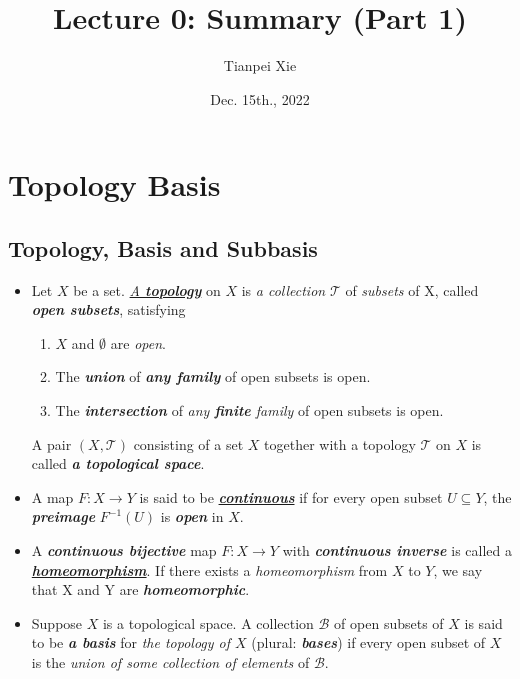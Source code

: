 \documentclass[11pt]{article}
\begin{document}
\title{Lecture 0: Summary (Part 1)}
\author{ Tianpei Xie}
\date{ Dec. 15th., 2022 }
\maketitle
\tableofcontents
\newpage
\section{Topology Basis}
\subsection{Topology, Basis and Subbasis}
\begin{itemize}
\item 
\begin{definition} 
Let $X$ be a set. \underline{\emph{A \textbf{topology}}} on $X$ is \emph{a collection} $\mathscr{T}$ of \emph{subsets} of X, called \emph{\textbf{open subsets}}, satisfying
\begin{enumerate}
\item $X$ and $\emptyset$ are \emph{open}.
\item The \emph{\textbf{union}} of \emph{\textbf{any family}} of open subsets is open.
\item The \emph{\textbf{intersection}} of \emph{any \textbf{finite} family} of open subsets is open.
\end{enumerate}
A pair $(X, \mathscr{T})$ consisting of a set $X$ together with a topology $\mathscr{T}$ on $X$ is called \emph{\textbf{a topological space}}.
\end{definition}

\item \begin{definition}
A map $F: X \rightarrow Y$ is said to be \underline{\emph{\textbf{continuous}}} if for every open subset $U \subseteq Y$, the \emph{\textbf{preimage}} $F^{-1}(U)$ is \emph{\textbf{open}} in $X$.
\end{definition}

\item \begin{definition}
A \emph{\textbf{continuous bijective}} map $F: X \rightarrow Y$ with \emph{\textbf{continuous inverse}} is called a \underline{\emph{\textbf{homeomorphism}}}. If there exists a \emph{homeomorphism} from $X$ to $Y$, we say that X and Y are \emph{\textbf{homeomorphic}}.
\end{definition}

\item \begin{definition}
Suppose $X$ is a topological space. A collection $\mathscr{B}$ of open subsets of $X$ is said to be \emph{\textbf{a basis}} for \emph{the topology of $X$} (plural: \emph{\textbf{bases}}) if every open subset of $X$ is the \emph{union of some collection of elements} of $\mathscr{B}$.


\end{definition}
\end{itemize}
\end{document}
